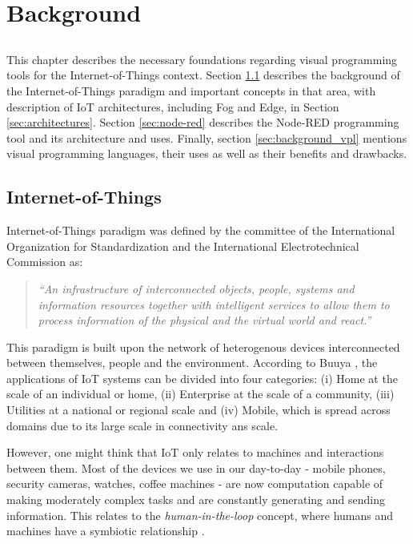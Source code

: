 \chapter{Background} \label{chap:background} \minitoc

\section*{}


This chapter describes the necessary foundations regarding visual programming tools for the Internet-of-Things context. Section \ref{sec:background_iot} describes the background of the Internet-of-Things paradigm and important concepts in that area, with description of IoT architectures, including Fog and Edge, in Section \ref{sec:architectures}. Section \ref{sec:node-red} describes the Node-RED programming tool and its architecture and uses. Finally, section \ref{sec:background_vpl} mentions visual programming languages, their uses as well as their benefits and drawbacks.

\section{Internet-of-Things}\label{sec:background_iot}

Internet-of-Things paradigm was defined by the committee of the International Organization for Standardization and the International Electrotechnical Commission \cite{ISOIEC} as:
\begin{quote}
    \emph{“An infrastructure of interconnected objects, people, systems and information resources together with intelligent services to allow them to process information of the physical and the virtual world and react.”}
\end{quote}
\par This paradigm is built upon the network of heterogenous devices interconnected between themselves, people and the environment. According to Buuya \cite{iot_future_direction}, the applications of IoT systems can be divided into four categories: (i) Home at the scale of an individual or home, (ii) Enterprise at the scale of a community, (iii) Utilities at a national or regional scale and (iv) Mobile, which is spread across domains due to its large scale in connectivity ans scale. 
\par However, one might think that IoT only relates to machines and interactions between them. Most of the devices we use in our day-to-day - mobile phones, security cameras, watches, coffee machines - are now computation capable of making moderately complex tasks and are constantly generating and sending information. This relates to the \emph{human-in-the-loop} concept, where humans and machines have a symbiotic relationship \cite{human_in_the_loop_survey}.
 
